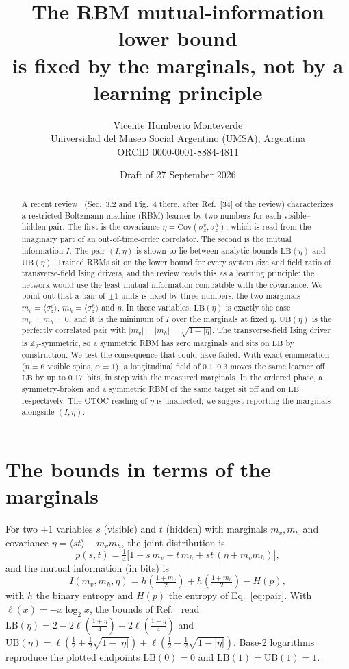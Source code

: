 \documentclass[11pt]{article}
\title{The RBM mutual-information lower bound\\ is fixed by the marginals, not by a learning principle}
\author{Vicente Humberto Monteverde\\
\small Universidad del Museo Social Argentino (UMSA), Argentina\\
\small ORCID 0000-0001-8884-4811}
\date{\small Draft of 27 September 2026}
\newcommand{\qv}{m_v}
\newcommand{\qh}{m_h}
\begin{document}
\maketitle

\begin{abstract}
A recent review~\cite{singh2026qml} (Sec.~3.2 and Fig.~4 there, after Ref.~[34] of the review)
characterizes a restricted Boltzmann machine (RBM) learner by two numbers for each visible--hidden
pair. The first is the covariance $\eta=\mathrm{Cov}(\sigma_z^v,\sigma_z^h)$, which is read from the
imaginary part of an out-of-time-order correlator. The second is the mutual information $I$. The pair
$(I,\eta)$ is shown to lie between analytic bounds $\mathrm{LB}(\eta)$ and $\mathrm{UB}(\eta)$. Trained
RBMs sit on the lower bound for every system size and field ratio of transverse-field Ising drivers,
and the review reads this as a learning principle: the network would use the least mutual information
compatible with the covariance. We point out that a pair of $\pm1$ units is fixed by three numbers,
the two marginals $m_v=\langle\sigma_z^v\rangle$, $m_h=\langle\sigma_z^h\rangle$ and $\eta$. In those
variables, $\mathrm{LB}(\eta)$ is exactly the case $m_v=m_h=0$, and it is the minimum of $I$ over the
marginals at fixed $\eta$. $\mathrm{UB}(\eta)$ is the perfectly correlated pair with
$|m_v|=|m_h|=\sqrt{1-|\eta|}$. The transverse-field Ising driver is $\mathbb{Z}_2$-symmetric, so a
symmetric RBM has zero marginals and sits on $\mathrm{LB}$ by construction. We test the consequence
that could have failed. With exact enumeration ($n=6$ visible spins, $\alpha=1$), a longitudinal field
of $0.1$--$0.3$ moves the same learner off $\mathrm{LB}$ by up to $0.17$~bits, in step with the
measured marginals. In the ordered phase, a symmetry-broken and a symmetric RBM of the same target sit
off and on $\mathrm{LB}$ respectively. The OTOC reading of $\eta$ is unaffected; we suggest reporting
the marginals alongside $(I,\eta)$.
\end{abstract}

\section{The bounds in terms of the marginals}

For two $\pm1$ variables $s$ (visible) and $t$ (hidden) with marginals $\qv,\qh$ and covariance
$\eta=\langle st\rangle-\qv\qh$, the joint distribution is
\begin{equation}\label{eq:pair}
p(s,t)=\tfrac14\big[1+s\,\qv+t\,\qh+st\,(\eta+\qv\qh)\big],
\end{equation}
and the mutual information (in bits) is
\begin{equation}
I(\qv,\qh,\eta)=h\!\left(\tfrac{1+\qv}{2}\right)+h\!\left(\tfrac{1+\qh}{2}\right)-H(p),
\end{equation}
with $h$ the binary entropy and $H(p)$ the entropy of Eq.~\eqref{eq:pair}. With $\ell(x)=-x\log_2x$, the
bounds of Ref.~\cite{singh2026qml} read $\mathrm{LB}(\eta)=2-2\ell(\tfrac{1+\eta}{4})-2\ell(\tfrac{1-\eta}{4})$ and
$\mathrm{UB}(\eta)=\ell(\tfrac12+\tfrac12\sqrt{1-|\eta|})+\ell(\tfrac12-\tfrac12\sqrt{1-|\eta|})$. Base-2
logarithms reproduce the plotted endpoints $\mathrm{LB}(0)=0$ and $\mathrm{LB}(1)=\mathrm{UB}(1)=1$.
\end{document}
